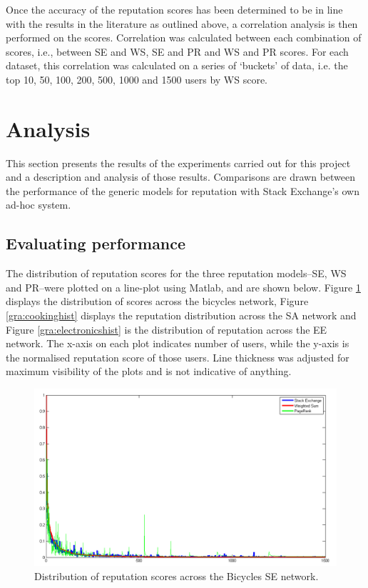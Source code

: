 \documentclass[]{final_report}
\begin{document}
Once the accuracy of the reputation scores has been determined to be in line with the results in the literature as outlined above, a correlation analysis is then performed on the scores. Correlation was calculated between each combination of scores, i.e., between SE and WS, SE and PR and WS and PR scores. For each dataset, this correlation was calculated on a series of `buckets' of data, i.e. the top 10, 50, 100, 200, 500, 1000 and 1500 users by WS score.


\section{Analysis}

This section presents the results of the experiments carried out for this project and a description and analysis of those results. Comparisons are drawn between the performance of the generic models for reputation with Stack Exchange's own ad-hoc system.

\subsection{Evaluating performance}

The distribution of reputation scores for the three reputation models--SE, WS and PR--were plotted on a line-plot using Matlab, and are shown below. Figure \ref{gra:bicyclehist} displays the distribution of scores across the bicycles network, Figure \ref{gra:cookinghist} displays the reputation distribution across the SA network and Figure \ref{gra:electronicshist} is the distribution of reputation across the EE network. The x-axis on each plot indicates number of users, while the y-axis is the normalised reputation score of those users. Line thickness was adjusted for maximum visibility of the plots and is not indicative of anything.

\begin{figure}[ht!]
\centering
\includegraphics[width=130mm]{chap5/bicycle_line.png}
\caption{Distribution of reputation scores across the Bicycles SE network.}
\label{gra:bicyclehist}
\end{figure}
\end{document}
